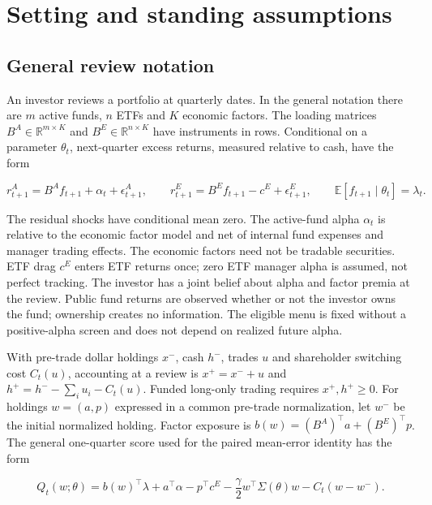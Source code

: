 \documentclass[11pt]{article}
\begin{document}
\section{Setting and standing assumptions}\label{sec:2}

\subsection*{General review notation}

An investor reviews a portfolio at quarterly dates. In the general
notation there are \(m\) active funds, \(n\) ETFs and \(K\) economic
factors. The loading matrices \(B^A\in\mathbb R^{m\times K}\) and
\(B^E\in\mathbb R^{n\times K}\) have instruments in rows. Conditional
on a parameter \(\theta_t\), next-quarter excess returns, measured
relative to cash, have the form

\begin{equation*}
r^A_{t+1}=B^A f_{t+1}+\alpha_t+\epsilon^A_{t+1},
\qquad
r^E_{t+1}=B^E f_{t+1}-c^E+\epsilon^E_{t+1},
\qquad \mathbb E[f_{t+1}\mid\theta_t]=\lambda_t.
\end{equation*}

The residual shocks have conditional mean zero. The active-fund
alpha \(\alpha_t\) is relative to the economic factor model and net
of internal fund expenses and manager trading effects. The economic
factors need not be tradable securities. ETF drag \(c^E\) enters ETF
returns once; zero ETF manager alpha is assumed, not perfect
tracking. The investor has a joint belief about alpha and factor
premia at the review. Public fund returns are observed whether or
not the investor owns the fund; ownership creates no information.
The eligible menu is fixed without a positive-alpha screen and does
not depend on realized future alpha.

With pre-trade dollar holdings \(x^-\), cash \(h^-\), trades \(u\)
and shareholder switching cost \(C_t(u)\), accounting at a review is
\(x^+=x^-+u\) and
\(h^+=h^--\sum_i u_i-C_t(u)\). Funded long-only trading requires
\(x^+,h^+\geq0\). For holdings \(w=(a,p)\) expressed in a common
pre-trade normalization, let \(w^-\) be the initial normalized
holding. Factor exposure is
\(b(w)=(B^A)^\top a+(B^E)^\top p\). The general one-quarter score
used for the paired mean-error identity has the form

\begin{equation*}
Q_t(w;\theta)=b(w)^\top\lambda+a^\top\alpha-p^\top c^E
 -\frac{\gamma}{2}w^\top\Sigma(\theta)w-C_t(w-w^-).
\end{equation*}
\end{document}
